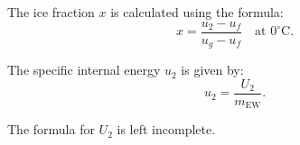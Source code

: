 The ice fraction \( x \) is calculated using the formula:  
\[
x = \frac{u_2 - u_f}{u_g - u_f} \quad \text{at } 0^\circ\text{C}.
\]  

The specific internal energy \( u_2 \) is given by:  
\[
u_2 = \frac{U_2}{m_{\text{EW}}}.
\]  

The formula for \( U_2 \) is left incomplete.